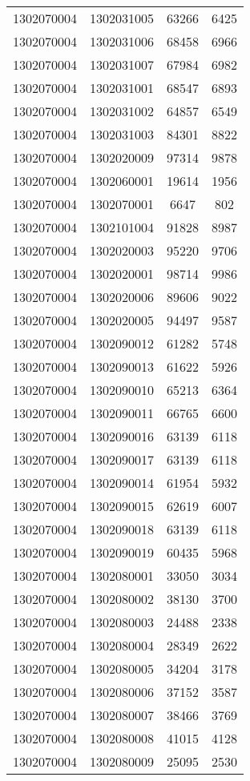 \begin{longtable}{llcc}
1302070004 & 1302031005 & 63266 & 6425\\
1302070004 & 1302031006 & 68458 & 6966\\
1302070004 & 1302031007 & 67984 & 6982\\
1302070004 & 1302031001 & 68547 & 6893\\
1302070004 & 1302031002 & 64857 & 6549\\
1302070004 & 1302031003 & 84301 & 8822\\
1302070004 & 1302020009 & 97314 & 9878\\
1302070004 & 1302060001 & 19614 & 1956\\
1302070004 & 1302070001 & 6647 & 802\\
1302070004 & 1302101004 & 91828 & 8987\\
1302070004 & 1302020003 & 95220 & 9706\\
1302070004 & 1302020001 & 98714 & 9986\\
1302070004 & 1302020006 & 89606 & 9022\\
1302070004 & 1302020005 & 94497 & 9587\\
1302070004 & 1302090012 & 61282 & 5748\\
1302070004 & 1302090013 & 61622 & 5926\\
1302070004 & 1302090010 & 65213 & 6364\\
1302070004 & 1302090011 & 66765 & 6600\\
1302070004 & 1302090016 & 63139 & 6118\\
1302070004 & 1302090017 & 63139 & 6118\\
1302070004 & 1302090014 & 61954 & 5932\\
1302070004 & 1302090015 & 62619 & 6007\\
1302070004 & 1302090018 & 63139 & 6118\\
1302070004 & 1302090019 & 60435 & 5968\\
1302070004 & 1302080001 & 33050 & 3034\\
1302070004 & 1302080002 & 38130 & 3700\\
1302070004 & 1302080003 & 24488 & 2338\\
1302070004 & 1302080004 & 28349 & 2622\\
1302070004 & 1302080005 & 34204 & 3178\\
1302070004 & 1302080006 & 37152 & 3587\\
1302070004 & 1302080007 & 38466 & 3769\\
1302070004 & 1302080008 & 41015 & 4128\\
1302070004 & 1302080009 & 25095 & 2530\\

\end{longtable}
